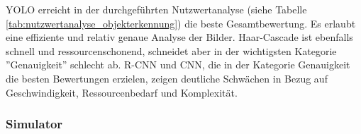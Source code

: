 \begin{table}[H]
    \caption{Nutzwertanalyse Objekterkennung}
    \label{tab:nutzwertanalyse_objekterkennung}
\end{table}

YOLO erreicht in der durchgeführten Nutzwertanalyse (siehe Tabelle \ref{tab:nutzwertanalyse_objekterkennung}) die beste Gesamtbewertung. Es erlaubt eine effiziente und relativ genaue Analyse der Bilder.
Haar-Cascade ist ebenfalls schnell und ressourcenschonend, schneidet aber in der wichtigsten Kategorie ''Genauigkeit'' schlecht ab.
R-CNN und CNN, die in der Kategorie Genauigkeit die besten Bewertungen erzielen, zeigen deutliche Schwächen in Bezug auf Geschwindigkeit, Ressourcenbedarf und Komplexität.


\subsubsection{Simulator}

